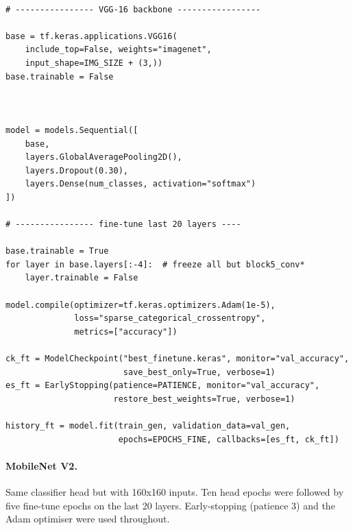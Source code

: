 \documentclass[a4paper,12pt]{article}
\begin{document}
\begin{lstlisting}[caption={VGG-16 Model Architecture},
                   label={lst:aug2}]

# ---------------- VGG-16 backbone ----------------- 

base = tf.keras.applications.VGG16(
    include_top=False, weights="imagenet",
    input_shape=IMG_SIZE + (3,))
base.trainable = False



model = models.Sequential([
    base,
    layers.GlobalAveragePooling2D(),
    layers.Dropout(0.30),
    layers.Dense(num_classes, activation="softmax")
])

# ---------------- fine-tune last 20 layers ----

base.trainable = True
for layer in base.layers[:-4]:  # freeze all but block5_conv*
    layer.trainable = False

model.compile(optimizer=tf.keras.optimizers.Adam(1e-5),
              loss="sparse_categorical_crossentropy",
              metrics=["accuracy"])

ck_ft = ModelCheckpoint("best_finetune.keras", monitor="val_accuracy",
                        save_best_only=True, verbose=1)
es_ft = EarlyStopping(patience=PATIENCE, monitor="val_accuracy",
                      restore_best_weights=True, verbose=1)

history_ft = model.fit(train_gen, validation_data=val_gen,
                       epochs=EPOCHS_FINE, callbacks=[es_ft, ck_ft])
\end{lstlisting}

\paragraph{MobileNet V2.} Same classifier head but with 160x160 inputs. Ten head epochs were followed by five fine-tune epochs on the last 20 layers.
Early-stopping (patience 3) and the Adam optimiser were used throughout.
\end{document}
